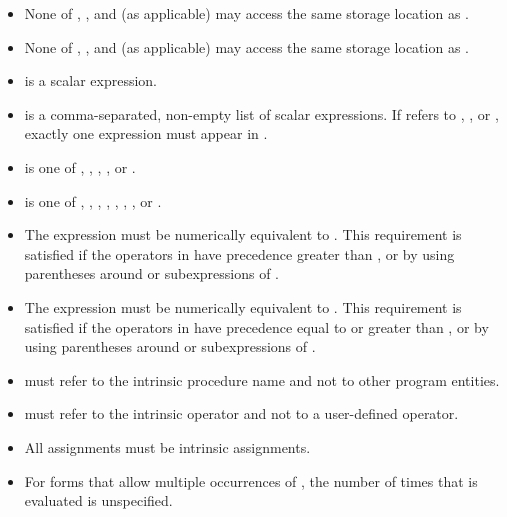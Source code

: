 \begin{fortranspecific}
\begin{itemize}
\item None of , , and  (as applicable) may access the same storage location as 
. 

\item None of , , and  (as applicable) may access the same storage location as 
.

\item {} is a scalar expression.

\item {} is a comma-separated, non-empty list of scalar expressions. If 
 refers to , , or , exactly one expression 
must appear in .

\item {} is one of , , , , or .

\item {} is one of \code{+}, \code{*}, \code{-}, \code{/}, , , , or .

\item The expression  must be numerically equivalent to . 
This requirement is satisfied if the operators in  have precedence greater than 
, or by using parentheses around  or subexpressions of .

\item The expression  must be numerically equivalent to . This requirement is satisfied if the operators in  have precedence equal to or 
greater than , or by using parentheses around  or subexpressions of .

\item {} must refer to the intrinsic procedure name and not to other 
program entities.

\item {} must refer to the intrinsic operator and not to a user-defined operator.

\item All assignments must be intrinsic assignments.

\item For forms that allow multiple occurrences of , the number of times that  is 
evaluated is unspecified.
\end{itemize}
\end{fortranspecific}


